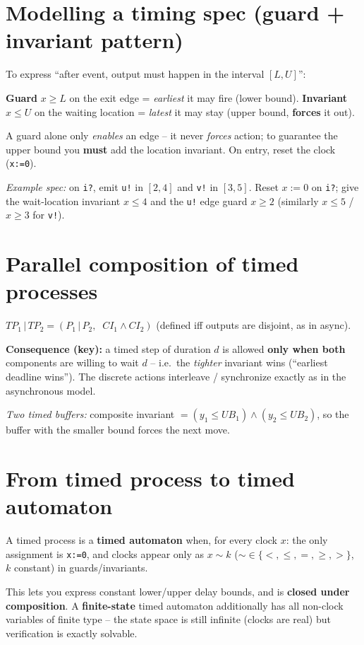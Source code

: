 \section{Modelling a timing spec (guard + invariant pattern)}
To express ``after event, output must happen in the interval $[L,U]$'':
\begin{keybox}
\textbf{Guard} $x\ge L$ on the exit edge = \emph{earliest} it may fire (lower bound). \quad
\textbf{Invariant} $x\le U$ on the waiting location = \emph{latest} it may stay (upper bound, \textbf{forces} it out).
\end{keybox}
A guard alone only \emph{enables} an edge -- it never \emph{forces} action; to guarantee the upper bound you \textbf{must} add the location invariant. On entry, reset the clock (\texttt{x:=0}).

\textit{Example spec:} on \texttt{i?}, emit \texttt{u!} in $[2,4]$ and \texttt{v!} in $[3,5]$. Reset $x{:=}0$ on \texttt{i?}; give the wait-location invariant $x\le4$ and the \texttt{u!} edge guard $x\ge2$ (similarly $x\le5$ / $x\ge3$ for \texttt{v!}).

\section{Parallel composition of timed processes}
\begin{keybox}
\centering $TP_1\,|\,TP_2=(P_1\,|\,P_2,\;\;CI_1\wedge CI_2)$ \quad(defined iff outputs are disjoint, as in async).
\end{keybox}
\textbf{Consequence (key):} a timed step of duration $d$ is allowed \textbf{only when both} components are willing to wait $d$ -- i.e.\ the \emph{tighter} invariant wins (``earliest deadline wins''). The discrete actions interleave / synchronize exactly as in the asynchronous model.

\textit{Two timed buffers:} composite invariant $=(y_1\le UB_1)\wedge(y_2\le UB_2)$, so the buffer with the smaller bound forces the next move.

\section{From timed process to timed automaton}
\begin{keybox}
A timed process is a \textbf{timed automaton} when, for every clock $x$: the only assignment is \texttt{x:=0}, and clocks appear only as $x\sim k$ ($\sim\in\{<,\le,=,\ge,>\}$, $k$ constant) in guards/invariants.
\end{keybox}
This lets you express constant lower/upper delay bounds, and is \textbf{closed under composition}. A \textbf{finite-state} timed automaton additionally has all non-clock variables of finite type -- the state space is still infinite (clocks are real) but verification is exactly solvable.

